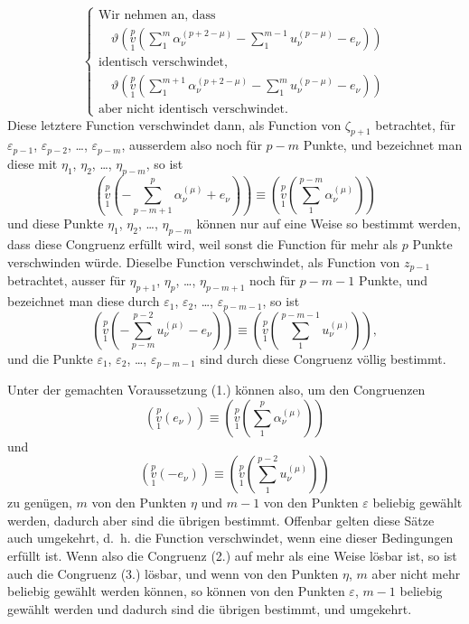 \documentclass{article}
\begin{document}
\[
\tag{(1.)}
\left\{
\begin{array}{l}
\text{Wir nehmen an, dass} \\
\quad \vartheta\left(\overset{p}{\underset{1}{v}}\left(\sum_1^m \alpha_\nu^{(p+2-\mu)} - \sum_1^{m-1} u_\nu^{(p-\mu)} - e_\nu\right)\right) \\
\text{identisch verschwindet,} \\
\quad \vartheta\left(\overset{p}{\underset{1}{v}}\left(\sum_1^{m+1} \alpha_\nu^{(p+2-\mu)} - \sum_1^m u_\nu^{(p-\mu)} - e_\nu\right)\right) \\
\text{aber nicht identisch verschwindet.}
\end{array}
\right.
\]
Diese letztere Function verschwindet dann, als Function von $\zeta_{p+1}$ betrachtet, für $\varepsilon_{p-1}$, $\varepsilon_{p-2}$, \dots, $\varepsilon_{p-m}$, ausserdem also noch für $p-m$ Punkte, und bezeichnet man diese mit $\eta_1$, $\eta_2$, \dots, $\eta_{p-m}$, so ist
\[
\left(\overset{p}{\underset{1}{v}}\left(-\sum_{p-m+1}^p \alpha_\nu^{(\mu)} + e_\nu\right)\right) \equiv \left(\overset{p}{\underset{1}{v}}\left(\sum_1^{p-m} \alpha_\nu^{(\mu)}\right)\right)
\]
und diese Punkte $\eta_1$, $\eta_2$, \dots, $\eta_{p-m}$ können nur auf eine Weise so bestimmt werden, dass diese Congruenz erfüllt wird, weil sonst die Function für mehr als $p$ Punkte verschwinden würde. Dieselbe Function verschwindet, als Function von $z_{p-1}$ betrachtet, ausser für $\eta_{p+1}$, $\eta_p$, \dots, $\eta_{p-m+1}$ noch für $p-m-1$ Punkte, und bezeichnet man diese durch $\varepsilon_1$, $\varepsilon_2$, \dots, $\varepsilon_{p-m-1}$, so ist
\[
\left(\overset{p}{\underset{1}{v}}\left(-\sum_{p-m}^{p-2} u_\nu^{(\mu)} - e_\nu\right)\right) \equiv \left(\overset{p}{\underset{1}{v}}\left(\sum_1^{p-m-1} u_\nu^{(\mu)}\right)\right),
\]
und die Punkte $\varepsilon_1$, $\varepsilon_2$, \dots, $\varepsilon_{p-m-1}$ sind durch diese Congruenz völlig bestimmt.

Unter der gemachten Voraussetzung (1.) können also, um den Congruenzen
\[
\tag{(2.)}
\left(\overset{p}{\underset{1}{v}}(e_\nu)\right) \equiv \left(\overset{p}{\underset{1}{v}}\left(\sum_1^p \alpha_\nu^{(\mu)}\right)\right)
\]
und
\[
\tag{(3.)}
\left(\overset{p}{\underset{1}{v}}(-e_\nu)\right) \equiv \left(\overset{p}{\underset{1}{v}}\left(\sum_1^{p-2} u_\nu^{(\mu)}\right)\right)
\]
zu genügen, $m$ von den Punkten $\eta$ und $m-1$ von den Punkten $\varepsilon$ beliebig gewählt werden, dadurch aber sind die übrigen bestimmt. Offenbar gelten diese Sätze auch umgekehrt, d.~h. die Function verschwindet, wenn eine dieser Bedingungen erfüllt ist. Wenn also die Congruenz (2.) auf mehr als eine Weise lösbar ist, so ist auch die Congruenz (3.) lösbar, und wenn von den Punkten $\eta$, $m$ aber nicht mehr beliebig gewählt werden können, so können von den Punkten $\varepsilon$, $m-1$ beliebig gewählt werden und dadurch sind die übrigen bestimmt, und umgekehrt.
\end{document}
